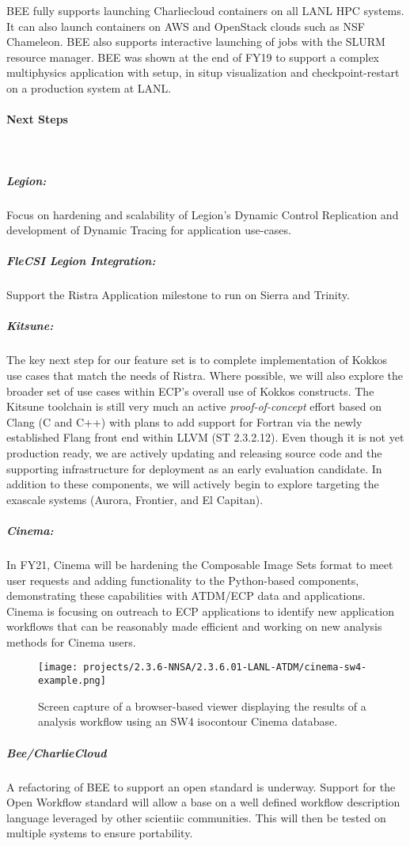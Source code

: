 BEE fully supports launching Charliecloud containers on all LANL HPC systems.
It can also launch containers on AWS and OpenStack clouds such as NSF
Chameleon.  BEE also supports interactive launching of jobs with the SLURM
resource manager. BEE was shown at the end of FY19 to support a complex multiphysics application with setup, in situp visualization and checkpoint-restart on a production system at LANL.

\paragraph{Next Steps} \leavevmode \\

\subparagraph{Legion:} 
Focus on hardening and scalability of Legion's Dynamic Control Replication and development of Dynamic Tracing for application use-cases. 

\subparagraph{FleCSI Legion Integration:} 
Support the Ristra Application milestone to run on Sierra and Trinity.

\subparagraph{Kitsune:}
The key next step for our feature set is to complete implementation of Kokkos use cases 
that match the needs of Ristra.  Where possible, we will also
explore the broader set of use cases within ECP's overall use of
Kokkos constructs.  The Kitsune toolchain is still very much an
active \emph{proof-of-concept} effort based on Clang (C and C++) with
plans to add support for Fortran via the newly established Flang front
end within LLVM (ST 2.3.2.12).  Even though it is not yet production
ready, we are actively updating and releasing source code and the supporting
infrastructure for deployment as an early evaluation candidate.  In
addition to these components, we will actively begin to explore targeting
the exascale systems (Aurora, Frontier, and El Capitan).


\subparagraph{Cinema:}
In FY21, Cinema will be hardening the Composable Image Sets format to meet user requests and adding functionality to the Python-based components, demonstrating these capabilities with ATDM/ECP data and applications.  Cinema is focusing on outreach to ECP applications to identify new application workflows that can be reasonably made efficient and working on new analysis methods for Cinema users.


\begin{figure}[htb]
	\centering
	\texttt{[image: projects/2.3.6-NNSA/2.3.6.01-LANL-ATDM/cinema-sw4-example.png]}
	\caption{
		Screen capture of a browser-based viewer displaying the results of a analysis workflow using an SW4 isocontour Cinema database.  
	\label{fig:cinema-sw4example}
	}
\end{figure}

\subparagraph{Bee/CharlieCloud}
A refactoring of BEE to support an open standard is underway. Support for the Open Workflow standard will allow a base on a well defined workflow description language leveraged by other scientiic communities. This will then be tested on multiple systems to ensure portability.
